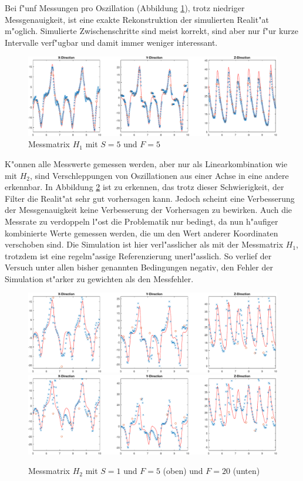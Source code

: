 \begin{refsection}
Bei f"unf Messungen pro Oszillation (Abbildung \ref{kalman:H1S5}), trotz niedriger Messgenauigkeit, ist eine exakte Rekonstruktion der simulierten Realit"at m"oglich. Simulierte Zwischenschritte sind meist korrekt, sind aber nur f"ur kurze Intervalle verf"ugbar und damit immer weniger interessant.
\begin{figure}
\centering
\includegraphics[width=\hsize]{kalman/figures/H1R05S5.pdf}
\caption{Messmatrix $H_{1}$ mit $S=5$ und $F=5$}
\label{kalman:H1S5}
\end{figure}

K"onnen alle Messwerte gemessen werden, aber nur als Linearkombination wie mit $H_{2}$, sind Verschleppungen von Oszillationen aus einer Achse in eine andere erkennbar. In Abbildung \ref{kalman:H2S1} ist zu erkennen, das trotz dieser Schwierigkeit, der Filter die Realit"at sehr gut vorhersagen kann. Jedoch scheint eine Verbesserung der Messgenauigkeit keine Verbesserung der Vorhersagen zu bewirken.
Auch die Messrate zu verdoppeln l"ost die Problematik nur bedingt, da nun h"aufiger kombinierte Werte gemessen werden, die um den Wert anderer Koordinaten verschoben sind. Die Simulation ist hier verl"asslicher als mit der Messmatrix $H_{1}$, trotzdem ist eine regelm"assige Referenzierung unerl"asslich. So verlief der Versuch unter allen bisher genannten Bedingungen negativ, den Fehler der Simulation st"arker zu gewichten als den Messfehler.

\begin{figure}
\centering
\includegraphics[width=\hsize]{kalman/figures/H2R05S1.pdf}
\includegraphics[width=\hsize]{kalman/figures/H2R20S1.pdf}
\caption{Messmatrix $H_{2}$ mit $S=1$ und $F=5$ (oben) und $F=20$ (unten)}
\label{kalman:H2S1}
\end{figure}


\end{refsection}
